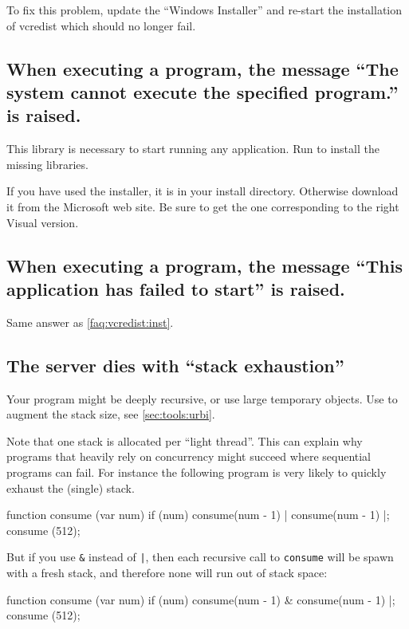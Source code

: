To fix this problem, update the ``Windows Installer'' and re-start the
installation of vcredist which should no longer fail.

\subsection{When executing a program, the message ``The system cannot
  execute the specified program.'' is raised.}
\label{faq:vcredist:inst}

This library is necessary to start running any application.  Run
 to install the missing libraries.

If you have used the \usdk installer, it is  in
your install directory.  Otherwise download it from the Microsoft web site.
Be sure to get the one corresponding to the right Visual \Cxx version.

\subsection{When executing a program, the message ``This application has
  failed to start'' is raised.}

Same answer as \autoref{faq:vcredist:inst}.

\subsection{The server dies with ``stack exhaustion''}
Your program might be deeply recursive, or use large temporary
objects.  Use  to augment the stack size, see
\autoref{sec:tools:urbi}.

Note that one stack is allocated per ``light thread''.  This can
explain why programs that heavily rely on concurrency might succeed
where sequential programs can fail.  For instance the following
program is very likely to quickly exhaust the (single) stack.

\begin{urbiunchecked}
function consume (var num)
{
  if (num)
    consume(num - 1) | consume(num - 1)
}|;
consume (512);
\end{urbiunchecked}

But if you use \lstinline{&} instead of \lstinline{|}, then each
recursive call to \lstinline{consume} will be spawn with a fresh
stack, and therefore none will run out of stack space:

\begin{urbiunchecked}
function consume (var num)
{
  if (num)
    consume(num - 1) & consume(num - 1)
}|;
consume (512);
\end{urbiunchecked}

